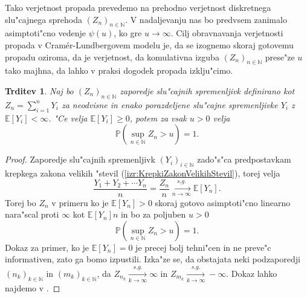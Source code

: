 \documentclass[12pt, a4paper, reqno]{amsart}
\theoremstyle{definition}
\theoremstyle{plain}
\newtheorem{trditev}[definicija]{Trditev}
\newcommand{\N}{\mathbb{N}}
\newcommand{\E}{\mathbb{E}}
\newcommand{\Prob}{\mathbb{P}}
\newcommand{\1}{\mathds{1}}
\begin{document}
        Tako verjetnost propada prevedemo na prehodno verjetnost diskretnega slu"cajnega 
        sprehoda $(Z_n)_{n\in\N}$. V nadaljevanju nas bo predvsem zanimalo asimptoti"cno 
        vedenje $\psi(u)$, ko gre $u\rightarrow\infty$. Cilj obravnavanja verjetnosti propada v 
        Cramér-Lundbergovem modelu je, da se izognemo skoraj gotovemu propadu oziroma, da je verjetnost, 
        da komulativna izguba $(Z_n)_{n\in\N}$ prese"ze $u$
        tako majhna, da lahko v praksi dogodek propada izklju"cimo. 

        \begin{trditev}
            Naj bo $(Z_n)_{n\in\N}$ zaporedje slu"cajnih spremenljivk definirano kot 
            $Z_n = \sum_{i=1}^nY_i$ za neodvisne in enako porazdeljene slu"cajne spremenljivke 
            $Y_i$ z $\E\left[Y_i\right] < \infty$. 
            "Ce velja $\E\left[Y_i\right] \geq 0$, potem za vsak $u>0$ velja
            \begin{equation*}
                \Prob\left(\sup_{n\in\N}Z_n > u\right) = 1.
            \end{equation*}
            \label{trd:propadZVerjetnostjo1}
        \end{trditev}

        \begin{proof}
            Zaporedje slu"cajnih spremenljivk $(Y_i)_{i\in\N}$ zado"s"ca predpostavkam krepkega zakona
            velikih "stevil (\ref{izr:KrepkiZakonVelikihStevil}), torej velja
            \begin{equation*}
                \frac{Y_1 + Y_2 + \cdots Y_n}{n} = \frac{Z_n}{n} \xrightarrow[n\to\infty]{s.g.} \E\left[Y_n\right].
            \end{equation*}
            Torej bo $Z_n$ v primeru ko je $\E\left[Y_n\right]>0$
             skoraj gotovo asimptoti"cno linearno nara"scal proti $\infty$ kot $\E\left[Y_n\right] n$ in 
             bo za poljuben $u>0$
            \begin{equation*}
                \Prob\left(\sup_{n\in\N}Z_n > u\right) = 1.
            \end{equation*}
            Dokaz za primer, ko je $\E\left[Y_n\right] = 0$ je precej bolj tehni"cen in ne preve"c informativen, zato 
            ga bomo izpustili. Izka"ze se, da obstajata neki podzaporedji$(n_k)_{k\in\N}$ in $(m_k)_{k\in\N}$, da 
            $Z_{n_k} \xrightarrow[k\to\infty]{s.g.}\infty$ in 
            $Z_{m_k} \xrightarrow[k\to\infty]{s.g.}-\infty$.
            Dokaz lahko najdemo v \cite{6}.
        \end{proof}
\end{document}
